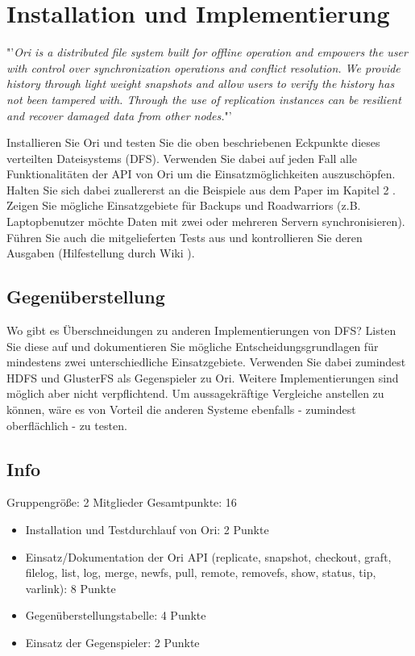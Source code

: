 
\section{Installation und Implementierung}
"'\textit{Ori is a distributed file system built for offline operation and empowers the user with control over synchronization operations and conflict resolution. We provide history through light weight snapshots and allow users to verify the history has not been tampered with. Through the use of replication instances can be resilient and recover damaged data from other nodes.}"' \cite{OrifsStanford}

Installieren Sie Ori und testen Sie die oben beschriebenen Eckpunkte dieses verteilten Dateisystems (DFS). Verwenden Sie dabei auf jeden Fall alle Funktionalitäten der API von Ori um die Einsatzmöglichkeiten auszuschöpfen. Halten Sie sich dabei zuallererst an die Beispiele aus dem Paper im Kapitel 2 \cite{OrifsHistory}. Zeigen Sie mögliche Einsatzgebiete für Backups und Roadwarriors (z.B. Laptopbenutzer möchte Daten mit zwei oder mehreren Servern synchronisieren). Führen Sie auch die mitgelieferten Tests aus und kontrollieren Sie deren Ausgaben (Hilfestellung durch Wiki \cite{OrifsBitbucket}).

\subsection{Gegenüberstellung}
Wo gibt es Überschneidungen zu anderen Implementierungen von DFS? Listen Sie diese auf und dokumentieren Sie mögliche Entscheidungsgrundlagen für mindestens zwei unterschiedliche Einsatzgebiete. Verwenden Sie dabei zumindest HDFS \cite{Hadoopfs} und GlusterFS \cite{Glusterfs} als Gegenspieler zu Ori. Weitere Implementierungen sind möglich aber nicht verpflichtend. Um aussagekräftige Vergleiche anstellen zu können, wäre es von Vorteil die anderen Systeme ebenfalls - zumindest oberflächlich - zu testen.


\subsection{Info}
Gruppengröße: 2 Mitglieder
Gesamtpunkte: 16

\begin{itemize}
\item Installation und Testdurchlauf von Ori: 2 Punkte
\item Einsatz/Dokumentation der Ori API (replicate, snapshot, checkout, graft, filelog, list, log, merge, newfs, pull, remote, removefs, show, status, tip, varlink): 8 Punkte
\item Gegenüberstellungstabelle: 4 Punkte
\item Einsatz der Gegenspieler: 2 Punkte
\end{itemize}

\clearpage
